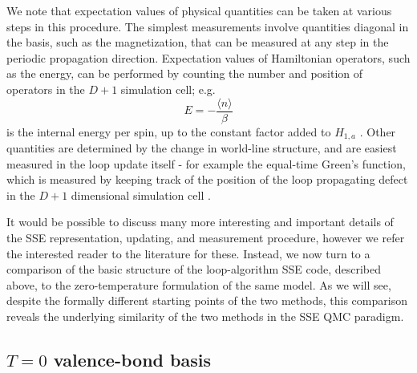\documentclass[vecphys]{svmult}
\begin{document}
We note that expectation values of physical quantities can be taken at various steps in this procedure.  The simplest measurements involve quantities diagonal in the basis, such as the magnetization, that can be measured at any step in the periodic propagation direction.  Expectation values of Hamiltonian operators, such as the energy, can be performed by counting the number and position of operators in the $D+1$ simulation cell; e.g.
\begin{equation}
E = - \frac{\langle n \rangle}{\beta}
\end{equation}
is the internal energy per spin, up to the constant factor added to $H_{1,a}$  \cite{Melko:Sandvik99}.
Other quantities are determined by the change in world-line structure, and are easiest measured in the loop update itself - for example the equal-time Green's function, which is measured by keeping track of the position of the loop propagating defect in the $D+1$ dimensional simulation cell \cite{Melko:WormA,Melko:gfsse,Melko:Assaad07}.

It would be possible to discuss many more interesting and important details of the SSE representation, updating, and measurement procedure, however we refer the interested reader to the literature for these.  Instead, we now turn to a comparison of the basic structure of the loop-algorithm SSE code, described above, to the zero-temperature formulation of the same model.  As we will see, despite the formally different starting points of the two methods, this comparison reveals the underlying similarity of the two methods in the SSE QMC paradigm.

\subsection{$T=0$ valence-bond basis} \label{Melko:VBB}
\end{document}
